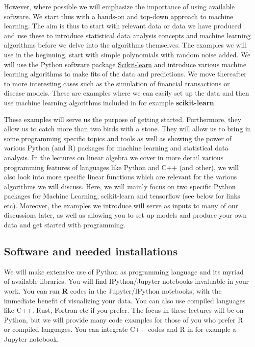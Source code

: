 \documentclass[%
oneside,                 %
final,                   %
10pt]{article}
\begin{document}
However, where possible we will emphasize the
importance of using available software. We start thus with a hands-on
and top-down approach to machine learning. The aim is thus to start with
relevant data or data we have produced 
and use these to introduce statistical data analysis
concepts and machine learning algorithms before we delve into the
algorithms themselves. The examples we will use in the beginning, start with simple
polynomials with random noise added. We will use the Python
software package \href{{http://scikit-learn.org/stable/}}{Scikit-learn} and
introduce various machine learning algorithms to make fits of
the data and predictions. We move thereafter to more interesting
cases such as the simulation of financial transactions or disease
models. These are examples where we can easily set up the data and
then use machine learning algorithms included in for example
\textbf{scikit-learn}. 

These examples will serve us the purpose of getting
started. Furthermore, they allow us to catch more than two birds with
a stone. They will allow us to bring in some programming specific
topics and tools as well as showing the power of various Python (and
R) packages for machine learning and statistical data analysis. In the
lectures on linear algebra we cover in more detail various programming
features of languages like Python and C++ (and other), we will also
look into more specific linear functions which are relevant for the
various algorithms we will discuss. Here, we will mainly focus on two
specific Python packages for Machine Learning, scikit-learn and
tensorflow (see below for links etc).  Moreover, the examples we
introduce will serve as inputs to many of our discussions later, as
well as allowing you to set up models and produce your own data and
get started with programming.





\subsection{Software and needed installations}

We will make extensive use of Python as programming language and its
myriad of available libraries.  You will find
IPython/Jupyter notebooks invaluable in your work.  You can run \textbf{R}
codes in the Jupyter/IPython notebooks, with the immediate benefit of
visualizing your data. You can also use compiled languages like C++,
Rust, Fortran etc if you prefer. The focus in these lectures will be
on Python, but we will provide many code examples for those of you who
prefer R or compiled languages. You can integrate C++ codes and R in for example
a Jupyter notebook. 
\end{document}
